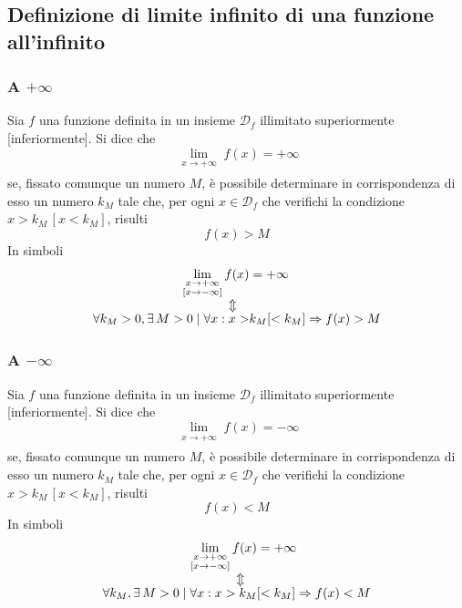 \subsection{Definizione di limite infinito di una funzione all'infinito}
\subsubsection{A $+\infty$}
\begin{definizioneLimiteInfinitoInfinito1}
  Sia $f$ una funzione definita in un insieme $\mathscr{D}_f$ illimitato superiormente 
  [inferiormente]. Si dice che
  \begin{equation*}
    \lim\limits_{\substack{x\to+\infty\\ [x\to-\infty]}}f(x)=+\infty
  \end{equation*}
  se, fissato comunque un numero $M$, è possibile determinare in corrispondenza di esso un numero 
  $k_M$ tale che, per ogni $x\in\mathscr{D}_f$ che verifichi la condizione $x>k_M\,[x<k_M]$, risulti
  \begin{equation*}
    f(x)>M
  \end{equation*}
  In simboli
  \begin{align*}
    \lim\limits_{\substack{x\to+\infty\\ [x\to-\infty]}}f(x)&=+\infty\\
    \ArrowBetweenLines
    \forall k_M>0, \exists\,M>0\mid\forall x: x>&k_M[<k_M] \Rightarrow f(x) > M
  \end{align*}
\end{definizioneLimiteInfinitoInfinito1}
\subsubsection{A $-\infty$}
\begin{definizioneLimiteInfinitoInfinito2}
  Sia $f$ una funzione definita in un insieme $\mathscr{D}_f$ illimitato superiormente 
  [inferiormente]. Si dice che
  \begin{equation*}
    \lim\limits_{\substack{x\to+\infty\\ [x\to-\infty]}} f(x)=-\infty
  \end{equation*}
  se, fissato comunque un numero $M$, è possibile determinare in corrispondenza di esso un numero 
  $k_M$ tale che, per ogni $x\in\mathscr{D}_f$ che verifichi la condizione $x>k_M\,[x<k_M]$, risulti
  \begin{equation*}
    f(x)<M
  \end{equation*}
  In simboli
  \begin{align*}
    \lim\limits_{\substack{x\to+\infty\\ [x\to-\infty]}}f(x)&=+\infty\\
    \ArrowBetweenLines
    \forall k_M, \exists\,M>0\mid\forall x: x>k_M&[<k_M] \Rightarrow f(x) < M
  \end{align*}
\end{definizioneLimiteInfinitoInfinito2}

